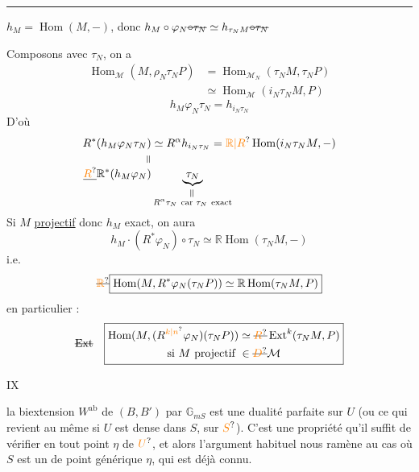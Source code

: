 \noindent\rule{.91\linewidth}{.3pt}\par
$h_M=\operatorname{Hom}(M,-)$, donc $h_M\circ\varphi_N\deleted{\circ\tau_N}\simeq h_{\tau_N M}\deleted{\circ\tau_N}$



Composons avec $\tau_N$, on a
\[
\begin{aligned}
\operatorname{Hom}_{\mathcal M}(M,\rho_N\tau_N P)&=\operatorname{Hom}_{\mathcal M_N}(\tau_N M,\tau_N P)\\
&\simeq\operatorname{Hom}_{\mathcal M}(i_N\tau_N M,P)
\end{aligned}
\]
\[
h_M\varphi_N\tau_N=h_{i_N\tau_N}
\]
D'où
\[
\begin{aligned}
R^*(h_M\varphi_N\tau_N)&\simeq R^{\alpha}h_{i_N\tau_N}=\unsure{\mathbb R|R}\operatorname{Hom}(i_N\tau_N M,-)\\
\rotatebox{90}{$=$}&\\[-1ex]
\deleted{\unsure{R}}\mathbb R^*(h_M\varphi_N)&\underbrace{\tau_N}_{\substack{\rotatebox{90}{$=$}\\R^\alpha\tau_N\ \text{car }\tau_N\ \text{exact}}}
\end{aligned}
\]
Si $M$ \uline{projectif} donc $h_M$ exact, on aura
\[
h_M\cdot(R^*\varphi_N)\circ\tau_N\simeq\mathbb R\operatorname{Hom}(\tau_N M,-)
\]
i.e.
\[
\deleted{\unsure{\mathbb R}}\boxed{\operatorname{Hom}(M,R^*\varphi_N(\tau_N P))\simeq\mathbb R\operatorname{Hom}(\tau_N M,P)}
\]
en particulier :
\[
\deleted{\operatorname{Ext}}\quad
\boxed{\begin{gathered}
\operatorname{Hom}(M,(R^{\unsure{k|n}}\varphi_N)(\tau_N P))\simeq\deleted{\unsure{R}}\operatorname{Ext}^{k}(\tau_N M,P)\\
\text{si } M\ \text{projectif }\in\deleted{\unsure{D}}\mathcal M
\end{gathered}}
\]

\hfill IX

la biextension $W^{\mathrm{ab}}$ de $(B,B')$ par $\mathbb G_{mS}$ est une dualité parfaite sur $U$ (ou ce qui revient au même si $U$ est dense dans $S$, sur $\unsure{S}$). C'est une propriété qu'il suffit de vérifier en tout point $\eta$ de $\unsure{U}$, et alors l'argument habituel nous ramène au cas où $S$ est un  de point générique $\eta$, qui est déjà connu.


